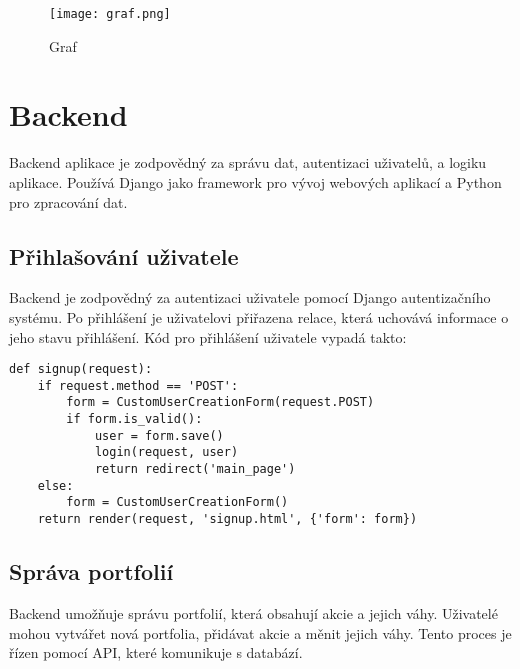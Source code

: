 \documentclass[12pt, a4paper]{report}
\begin{document}
\begin{figure}[h]
	\centering
	\texttt{[image: graf.png]}
    \caption{Graf}
\end{figure}

\section{Backend}

Backend aplikace je zodpovědný za správu dat, autentizaci uživatelů, a logiku aplikace. Používá Django jako framework pro vývoj webových aplikací a Python pro zpracování dat.

\subsection{Přihlašování uživatele}

Backend je zodpovědný za autentizaci uživatele pomocí Django autentizačního systému. Po přihlášení je uživatelovi přiřazena relace, která uchovává informace o jeho stavu přihlášení. Kód pro přihlášení uživatele vypadá takto:

\begin{lstlisting}[style=Python, caption= Kód pro přihlášení uživatele]
def signup(request):
    if request.method == 'POST':
        form = CustomUserCreationForm(request.POST)
        if form.is_valid():
            user = form.save()
            login(request, user)
            return redirect('main_page')
    else:
        form = CustomUserCreationForm()
    return render(request, 'signup.html', {'form': form})
\end{lstlisting}

\subsection{Správa portfolií}

Backend umožňuje správu portfolií, která obsahují akcie a jejich váhy. Uživatelé mohou vytvářet nová portfolia, přidávat akcie a měnit jejich váhy. Tento proces je řízen pomocí API, které komunikuje s databází.
\end{document}
